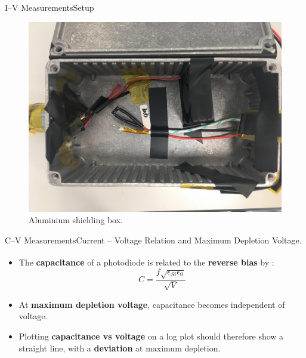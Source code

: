 \documentclass{beamer}
\begin{document}
    \begin{frame}{I--V Measurements}{Setup}
        \begin{figure}
            \centering
            \includegraphics[width = 0.7\linewidth]{Photodiode_Box.jpg}
            \caption{Aluminium shielding box.}
            \label{fig:IVbox}
        \end{figure}
    \end{frame}
    
    \begin{frame}{C--V Measurements}{Current -- Voltage Relation and Maximum Depletion Voltage.}
        \begin{itemize}
            \item The \textbf{capacitance} of a photodiode is related to the \textbf{reverse bias} by \textsuperscript{\cite{Casse}}:
                \begin{equation*}
                    C = \frac{f\sqrt{\epsilon_{Si}\epsilon_0}}{\sqrt{V}}
                \end{equation*}
            \item At \textbf{maximum depletion voltage}, capacitance becomes independent of voltage.
            \vspace{0.5cm}
            \item Plotting \textbf{capacitance vs voltage} on a log plot should therefore show a straight line, with a \textbf{deviation} at maximum depletion.
        \end{itemize}
    \end{frame}
    
\end{document}
